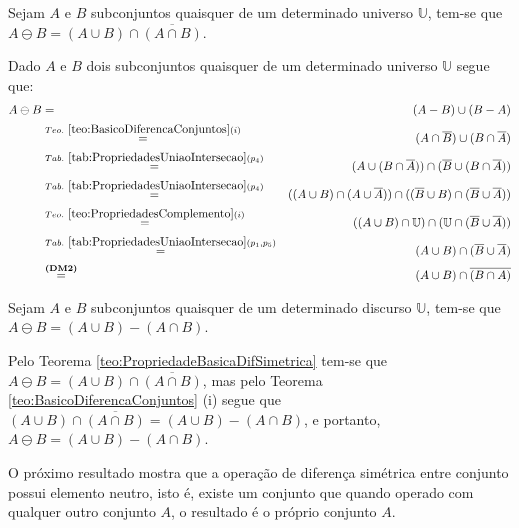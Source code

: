 \begin{teorema}\label{teo:PropriedadeBasicaDifSimetrica}
	Sejam $A$ e $B$ subconjuntos quaisquer de um determinado universo $\mathbb{U}$, tem-se que $A \ominus B = (A \cup B) \cap \overline{(A \cap B)}$.
\end{teorema}

\begin{prova}
	Dado $A$ e $B$ dois subconjuntos quaisquer de um determinado universo $\mathbb{U}$ segue que:
	\begin{eqnarray*}
		A \ominus B & = &  (A - B) \cup (B - A)\\
		& \stackrel{Teo. \  \ref{teo:BasicoDiferencaConjuntos}(i)}{=} & (A \cap \overline{B}) \cup (B \cap \overline{A})\\
		& \stackrel{Tab. \ \ref{tab:PropriedadesUniaoIntersecao}(p_4)}{=}& (A \cup (B \cap \overline{A})) \cap (\overline{B} \cup (B \cap \overline{A}))\\
		& \stackrel{Tab. \ \ref{tab:PropriedadesUniaoIntersecao}(p_4)}{=}& ((A \cup B) \cap (A \cup \overline{A})) \cap ((\overline{B} \cup B) \cap (\overline{B} \cup \overline{A}))\\
		& \stackrel{Teo. \ \ref{teo:PropriedadesComplemento}(i)}{=}& ((A \cup B) \cap \mathbb{U}) \cap (\mathbb{U} \cap (\overline{B} \cup \overline{A}))\\
		& \stackrel{Tab. \ \ref{tab:PropriedadesUniaoIntersecao}(p_1, p_5)}{=}& (A \cup B) \cap (\overline{B} \cup \overline{A})\\
		& \stackrel{\textbf{(DM2)}}{=}& (A \cup B) \cap \overline{(B \cap A)}
	\end{eqnarray*}
\end{prova}

\begin{corolario}\label{col:DiferencaSimetrica}
  Sejam $A$ e $B$ subconjuntos quaisquer de um determinado discurso $\mathbb{U}$, tem-se que $A \ominus B = (A \cup B) - (A \cap B)$.
\end{corolario}

\begin{prova}
	Pelo Teorema \ref{teo:PropriedadeBasicaDifSimetrica} tem-se que $A \ominus B = (A \cup B) \cap \overline{(A \cap B)}$, mas pelo Teorema \ref{teo:BasicoDiferencaConjuntos} (i) segue que $(A \cup B) \cap \overline{(A \cap B)} = (A \cup B) - (A \cap B)$, e portanto, $A \ominus B = (A \cup B) - (A \cap B)$.
\end{prova}

O próximo resultado mostra que a operação de diferença simétrica entre conjunto possui elemento neutro, isto é, existe um conjunto que quando operado com qualquer outro conjunto $A$, o resultado é o próprio conjunto $A$.

